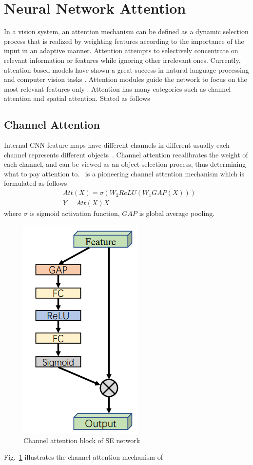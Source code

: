 \section{Neural Network Attention}
In a vision system, an attention mechanism can be defined as a dynamic selection process that is realized by weighting features according to the importance of the input in an adaptive manner. Attention attempts to selectively concentrate on relevant information or features while ignoring other irrelevant ones.  Currently, attention based models have shown a great success in natural language processing \cite{vaswani2017attention} and computer vision tasks \cite{guo2022attention}. Attention modules guide the network to focus on the most relevant features only \cite{guo2022attention}. Attention has many categories such as channel attention and spatial attention. Stated as follows 
\subsection{Channel Attention}
Internal CNN feature maps have different channels in different usually each channel represents different objects~\cite{chen2017sca}. Channel attention recalibrates the weight of each channel, and can be viewed as an object selection process, thus determining what to pay attention to.~\cite{hu2018squeeze} is a pioneering channel attention mechanism which is formulated as follows
 \begin{equation}
    \begin{split}
        &Att(X) = \sigma(W_2ReLU(W_1GAP(X)))\\
        &Y = Att(X)X 
    \end{split}
\end{equation}
\noindent where $\sigma$ is sigmoid activation function, $GAP$ is global average pooling.
\begin{figure}
    \begin{center}
        \includegraphics[width=.3\textwidth]{Figures/SE_attentBlock.png}
        \caption{\label{fig:SE_block} Channel attention block of SE network}
    \end{center}
\end{figure}
Fig.~\ref{fig:SE_block} illustrates the channel attention mechanism of~\cite{hu2018squeeze}
